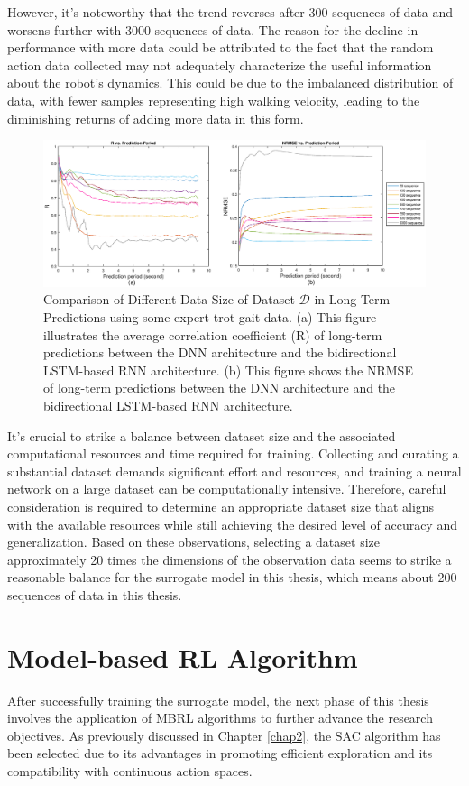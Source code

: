 However, it's noteworthy that the trend reverses after 300 sequences of data and worsens further with 3000 sequences of data. The reason for the decline in performance with more data could be attributed to the fact that the random action data collected may not adequately characterize the useful information about the robot's dynamics. This could be due to the imbalanced distribution of data, with fewer samples representing high walking velocity, leading to the diminishing returns of adding more data in this form.
\begin{figure}[htb]
    \centering
    \includegraphics[width=\linewidth]{img/chap4/datasize.eps}
    \caption{Comparison of Different Data Size of Dataset $\mathcal{D}$ in Long-Term Predictions using some expert trot gait data. (a) This figure illustrates the average correlation coefficient (R) of long-term predictions between the DNN architecture and the bidirectional LSTM-based RNN architecture. (b) This figure shows the \ac{NRMSE} of long-term predictions between the DNN architecture and the bidirectional LSTM-based RNN architecture.}
    \label{fig:datasize}
\end{figure}

It's crucial to strike a balance between dataset size and the associated computational resources and time required for training. Collecting and curating a substantial dataset demands significant effort and resources, and training a neural network on a large dataset can be computationally intensive. Therefore, careful consideration is required to determine an appropriate dataset size that aligns with the available resources while still achieving the desired level of accuracy and generalization. Based on these observations, selecting a dataset size approximately 20 times the dimensions of the observation data seems to strike a reasonable balance for the surrogate model in this thesis, which means about 200 sequences of data in this thesis.

\section{Model-based RL Algorithm}
After successfully training the surrogate model, the next phase of this thesis involves the application of \ac{MBRL} algorithms to further advance the research objectives. As previously discussed in Chapter \ref{chap2}, the \ac{SAC} algorithm has been selected due to its advantages in promoting efficient exploration and its compatibility with continuous action spaces. 

